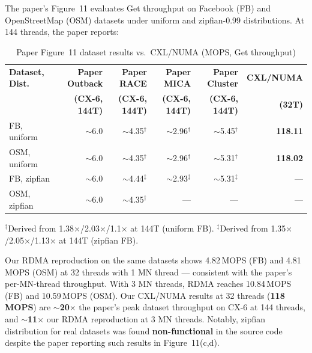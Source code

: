 \documentclass[11pt,a4paper]{article}
\begin{document}
The paper's Figure~11 evaluates Get throughput on Facebook (FB) and OpenStreetMap (OSM) datasets under uniform and zipfian-0.99 distributions. At 144 threads, the paper reports:

\begin{table}[H]
\centering
\caption{Paper Figure~11 dataset results vs.\ CXL/NUMA (MOPS, Get throughput)}
\label{tab:paper-fig11}
\small
\begin{tabular}{@{}lrrrrr@{}}
\toprule
\textbf{Dataset, Dist.} & \textbf{Paper Outback} & \textbf{Paper RACE} & \textbf{Paper MICA} & \textbf{Paper Cluster} & \textbf{CXL/NUMA} \\
 & \textbf{(CX-6, 144T)} & \textbf{(CX-6, 144T)} & \textbf{(CX-6, 144T)} & \textbf{(CX-6, 144T)} & \textbf{(32T)} \\
\midrule
FB, uniform & $\sim$6.0 & $\sim$4.35$^\dagger$ & $\sim$2.96$^\dagger$ & $\sim$5.45$^\dagger$ & \textbf{118.11} \\
OSM, uniform & $\sim$6.0 & $\sim$4.35$^\dagger$ & $\sim$2.96$^\dagger$ & $\sim$5.31$^\dagger$ & \textbf{118.02} \\
FB, zipfian & $\sim$6.0 & $\sim$4.44$^\ddagger$ & $\sim$2.93$^\ddagger$ & $\sim$5.31$^\ddagger$ & --- \\
OSM, zipfian & $\sim$6.0 & $\sim$4.35$^\dagger$ & --- & --- & --- \\
\bottomrule
\end{tabular}

\vspace{2pt}
{\scriptsize $^\dagger$Derived from 1.38$\times$/2.03$\times$/1.1$\times$ at 144T (uniform FB). \quad $^\ddagger$Derived from 1.35$\times$/2.05$\times$/1.13$\times$ at 144T (zipfian FB).}
\end{table}

Our RDMA reproduction on the same datasets shows 4.82\,MOPS (FB) and 4.81\,MOPS (OSM) at 32 threads with 1 MN thread --- consistent with the paper's per-MN-thread throughput. With 3 MN threads, RDMA reaches 10.84\,MOPS (FB) and 10.59\,MOPS (OSM). Our CXL/NUMA results at 32 threads (\textbf{118\,MOPS}) are \textbf{$\sim$20$\times$} the paper's peak dataset throughput on CX-6 at 144 threads, and \textbf{$\sim$11$\times$} our RDMA reproduction at 3 MN threads. Notably, zipfian distribution for real datasets was found \textbf{non-functional} in the source code despite the paper reporting such results in Figure~11(c,d).
\end{document}
